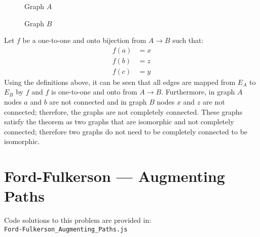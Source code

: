 \documentclass{article}
\begin{document}
\begin{figure}[H]
    \centering
    \caption{Graph $A$}
    \label{fig:graph_a}
\end{figure}
\begin{figure}[H]
    \centering
    \caption{Graph $B$}
    \label{fig:graph_b}
\end{figure}
Let $f$ be a one-to-one and onto bijection from $A \rightarrow B$ such that:
\begin{align*}
    f(a) &= x \\
    f(b) &= z \\
    f(c) &= y
\end{align*}
Using the definitions above, it can be seen that all edges are mapped from $E_A$ to $E_B$ by $f$ and $f$ is one-to-one and onto from $A \rightarrow B$. Furthermore, in graph $A$ nodes $a$ and $b$ are not connected and in graph $B$ nodes $x$ and $z$ are not connected; therefore, the graphs are not completely connected. These graphs satisfy the theorem as two graphs that are isomorphic and not completely connected; therefore two graphs do not need to be completely connected to be isomorphic.

\section{Ford-Fulkerson --- Augmenting Paths}
Code solutions to this problem are provided in: \\ \texttt{Ford-Fulkerson\_Augmenting\_Paths.js}
\end{document}
